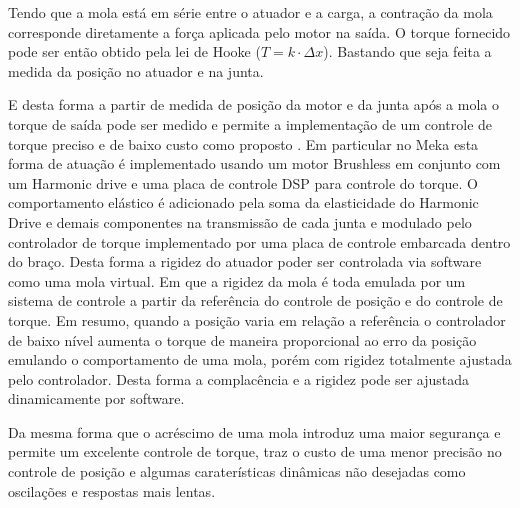 Tendo que a mola está em série entre o atuador e a carga, a contração da mola corresponde diretamente a força aplicada pelo motor na saída. O torque fornecido pode ser então obtido pela lei de Hooke ($T = k\cdot \Delta x$). Bastando que seja feita a medida da posição no atuador e na junta.


E desta forma a partir de medida de posição da motor e da junta após a mola o torque de saída pode ser medido e permite a implementação de um controle de torque preciso e de baixo custo como proposto \cite{nobody}. Em particular no Meka esta forma de atuação é implementado usando um motor Brushless em conjunto com um Harmonic drive e uma placa de controle DSP para controle do torque. O comportamento elástico é adicionado pela soma da elasticidade do Harmonic Drive e demais componentes na transmissão de cada junta e modulado pelo controlador de torque implementado por uma placa de controle embarcada dentro do braço. Desta forma a rigidez do atuador poder ser controlada via software como uma mola virtual. Em que a rigidez da mola é toda emulada por um sistema de controle a partir da referência do controle de posição e do controle de torque. Em resumo, quando a posição varia em relação a referência o controlador de baixo nível aumenta o torque de maneira proporcional ao erro da posição emulando o comportamento de uma mola, porém com rigidez totalmente ajustada pelo controlador. Desta forma a complacência e a rigidez pode ser ajustada dinamicamente por software. \cite{nobody}

Da mesma forma que o acréscimo de uma mola introduz uma maior segurança e permite um excelente controle de torque, traz o custo de uma menor precisão no controle de posição e algumas caraterísticas dinâmicas não desejadas como oscilações e respostas mais lentas.




